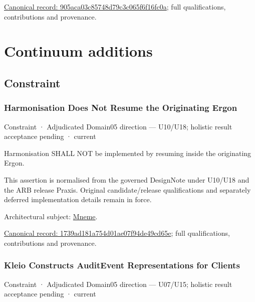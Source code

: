 {\footnotesize \href{../../../../continuum/motivation/goal/905aca03c85748d79c3c065f6f16fc0a.md}{Canonical record: 905aca03c85748d79c3c065f6f16fc0a}; full qualifications, contributions and provenance.}\par
\chapter{Continuum additions}

\section{Constraint}

\subsection{Harmonisation Does Not Resume the Originating Ergon}

\label{element:1739ad181a754d01ae07f94de49cd65e}
{\small Constraint · Adjudicated Domain05 direction — U10/U18; holistic result acceptance pending · current}\par

Harmonisation SHALL NOT be implemented by resuming inside the originating Ergon.



This assertion is normalised from the governed DesignNote under U10/U18 and the ARB release Praxis. Original candidate/release qualifications and separately deferred implementation details remain in force.



Architectural subject: \hyperref[element:1af8a56358f7429fabfb57be66542a99]{Mneme}.


{\footnotesize \href{../../../../continuum/motivation/constraint/1739ad181a754d01ae07f94de49cd65e.md}{Canonical record: 1739ad181a754d01ae07f94de49cd65e}; full qualifications, contributions and provenance.}\par
\subsection{Kleio Constructs AuditEvent Representations for Clients}

\label{element:1aa42a9aa5a644bc9072522e0a123352}
{\small Constraint · Adjudicated Domain05 direction — U07/U15; holistic result acceptance pending · current}\par

